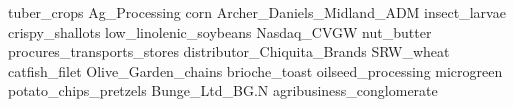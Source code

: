 tuber\_crops Ag\_Processing corn Archer\_Daniels\_Midland\_ADM insect\_larvae crispy\_shallots low\_linolenic\_soybeans Nasdaq\_CVGW nut\_butter procures\_transports\_stores distributor\_Chiquita\_Brands SRW\_wheat catfish\_filet Olive\_Garden\_chains brioche\_toast oilseed\_processing microgreen potato\_chips\_pretzels Bunge\_Ltd\_BG.N agribusiness\_conglomerate 
